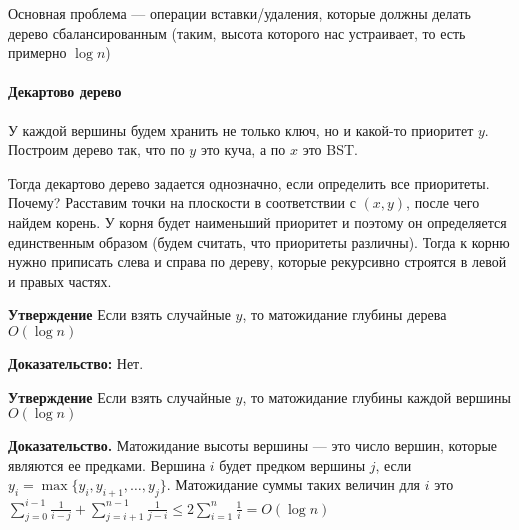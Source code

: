 \documentclass[12pt]{article}
\newcommand{\rangesum}[2]{\displaystyle \sum_{#1}^{#2}}
\begin{document}
Основная проблема --- операции вставки/удаления, которые должны делать дерево сбалансированным (таким, высота которого нас устраивает, то есть примерно $\log n$)

\paragraph{Декартово дерево}

У каждой вершины будем хранить не только ключ, но и какой-то приоритет $y$. Построим дерево так, что по $y$ это куча, а по $x$ это BST.

Тогда декартово дерево задается однозначно, если определить все приоритеты. Почему? Расставим точки на плоскости в соответствии с $(x, y)$, после чего найдем корень. У корня будет наименьший приоритет и поэтому он определяется единственным образом (будем считать, что приоритеты различны). Тогда к корню нужно приписать слева и справа по дереву, которые рекурсивно строятся в левой и правых частях.

\textbf{Утверждение} Если взять случайные $y$, то матожидание глубины дерева $O(\log n)$

\textbf{Доказательство:} Нет.

\textbf{Утверждение} Если взять случайные $y$, то матожидание глубины каждой вершины $O(\log n)$

\textbf{Доказательство.} Матожидание высоты вершины --- это число вершин, которые являются ее предками. Вершина $i$ будет предком вершины $j$, если $y_i = \max \{y_i, y_{i+1}, \dots, y_j\}$. Матожидание суммы таких величин для $i$ это $\rangesum{j=0}{i-1} \frac{1}{i-j} + \rangesum{j=i+1}{n-1} \frac{1}{j-i} \le 2 \rangesum{i=1}{n} \frac{1}{i} = O(\log n)$
\end{document}
